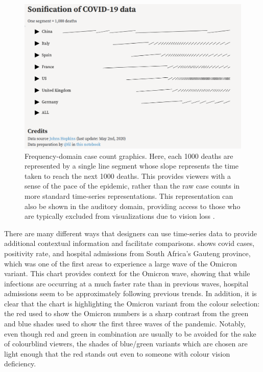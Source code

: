 \documentclass[article]{jdssv}\usepackage[]{graphicx}\usepackage[]{xcolor}
\begin{document}
\begin{figure}
\centering
\includegraphics[width=.75\linewidth]{frequency-domain}
\caption{Frequency-domain case count graphics. Here, each 1000 deaths are represented by a single line segment whose slope represents the time taken to reach the next 1000 deaths. This provides viewers with a sense of the pace of the epidemic, rather than the raw case counts in more standard time-series representations. This representation can also be shown in the auditory domain, providing access to those who are typically excluded from visualizations due to vision loss \citep{vuillemotSonificationCOVID19Data2020}.}
\label{fig:freq-domain}
\end{figure}

There are many different ways that designers can use time-series data to provide additional contextual information and facilitate comparisons.  shows covid cases, positivity rate, and hospital admissions from South Africa's Gauteng province, which was one of the first areas to experience a large wave of the Omicron variant. This chart provides context for the Omicron wave, showing that while infections are occurring at a much faster rate than in previous waves, hospital admissions seem to be approximately following previous trends. In addition, it is clear that the chart is highlighting the Omicron variant from the colour selection: the red used to show the Omicron numbers is a sharp contrast from the green and blue shades used to show the first three waves of the pandemic. Notably, even though red and green in combination are usually to be avoided for the sake of colourblind viewers, the shades of blue/green variants which are chosen are light enough that the red stands out even to someone with colour vision deficiency.
\end{document}
